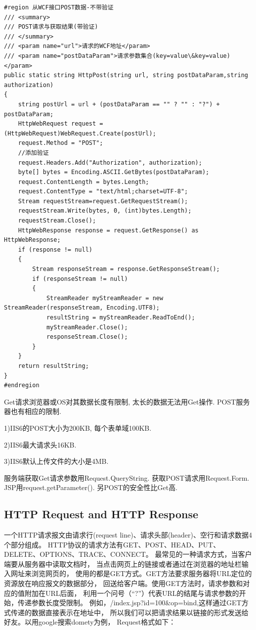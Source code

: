 \documentclass{book}
\begin{document}
\begin{lstlisting}[language={[Sharp]C},caption=REST方式POST，不带验证,label={Code:RESTPostData}]
#region 从WCF接口POST数据-不带验证
/// <summary>  
/// POST请求与获取结果(带验证)  
/// </summary>  
/// <param name="url">请求的WCF地址</param>
/// <param name="postDataParam">请求参数集合(key=value\&key=value)</param>
public static string HttpPost(string url, string postDataParam,string authorization)
{
    string postUrl = url + (postDataParam == "" ? "" : "?") + postDataParam;
    HttpWebRequest request = (HttpWebRequest)WebRequest.Create(postUrl);
    request.Method = "POST";
    //添加验证
    request.Headers.Add("Authorization", authorization);
    byte[] bytes = Encoding.ASCII.GetBytes(postDataParam);
    request.ContentLength = bytes.Length;
    request.ContentType = "text/html;charset=UTF-8";
    Stream requestStream=request.GetRequestStream();
    requestStream.Write(bytes, 0, (int)bytes.Length);
    requestStream.Close();
    HttpWebResponse response = request.GetResponse() as HttpWebResponse;
    if (response != null)
    {
        Stream responseStream = response.GetResponseStream();
        if (responseStream != null)
        {
            StreamReader myStreamReader = new StreamReader(responseStream, Encoding.UTF8);
            resultString = myStreamReader.ReadToEnd();
            myStreamReader.Close();
            responseStream.Close();
        }
    }
    return resultString;
}
#endregion
\end{lstlisting}

Get请求浏览器或OS对其数据长度有限制,
太长的数据无法用Get操作.
POST服务器也有相应的限制.

1)IIS6的POST大小为200KB,
每个表单域100KB.

2)IIS6最大请求头16KB.

3)IIS6默认上传文件的大小是4MB.

服务端获取Get请求参数用Request.QueryString.
获取POST请求用Request.Form.
JSP用request.getParameter().
另POST的安全性比Get高.

\subsection{HTTP Request and HTTP Response}

一个HTTP请求报文由请求行(request line)、请求头部(header)、空行和请求数据4个部分组成。
HTTP协议的请求方法有GET、POST、HEAD、PUT、DELETE、OPTIONS、TRACE、CONNECT。
最常见的一种请求方式，当客户端要从服务器中读取文档时，
当点击网页上的链接或者通过在浏览器的地址栏输入网址来浏览网页的，
使用的都是GET方式。GET方法要求服务器将URL定位的资源放在响应报文的数据部分，
回送给客户端。使用GET方法时，请求参数和对应的值附加在URL后面，
利用一个问号（“?”）代表URL的结尾与请求参数的开始，传递参数长度受限制。
例如，/index.jsp?id=100\&op=bind,这样通过GET方式传递的数据直接表示在地址中，
所以我们可以把请求结果以链接的形式发送给好友。以用google搜索domety为例，
Request格式如下：
\end{document}
